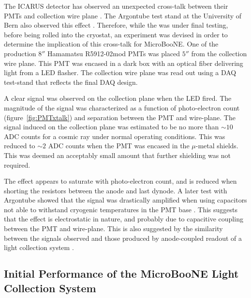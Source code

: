 The ICARUS detector has observed an unexpected cross-talk between their PMTs and collection wire plane \cite{Icarus:0812}. The Argontube test stand at the University of Bern also observed this effect \cite{BernPrivate}.   Therefore, while the \lartpc was under final testing, before being rolled into the cryostat, an experiment was devised in order to determine the implication of this cross-talk for MicroBooNE.  One of the production $8''$ Hamamatsu R5912-02mod PMTs was placed $5''$ from the \lartpc collection wire plane. This PMT was encased in a dark box with an optical fiber delivering light from a LED flasher. The collection wire plane was read out using a DAQ test-stand that reflects the final DAQ design.

A clear signal was observed on the collection plane when the LED fired. The magnitude of the signal was characterized as a function of photo-electron count (figure~\ref{fig:PMTxtalk}) and separation between the PMT and wire-plane. The signal induced on the collection plane was estimated to be no more than $\sim10$ ADC counts for a cosmic ray under normal operating conditions. This was reduced to $\sim2$ ADC counts when the PMT was encased in the $\mu$-metal shields. This was deemed an acceptably small amount that further shielding was not required.

The effect appears to saturate with photo-electron count, and is reduced when shorting the resistors between the anode and last dynode. A later test with Argontube showed that the signal was drastically amplified when using capacitors not able to withstand cryogenic temperatures in the PMT base \cite{BernPrivate}. This suggests that the effect is electrostatic in nature, and probably due to capacitive coupling between the PMT and wire-plane.  This is also suggested by the similarity between the signals observed and those produced by anode-coupled readout of a light collection system \cite{Moss:2015hha}.

\subsection{Initial Performance of the MicroBooNE Light Collection System}

